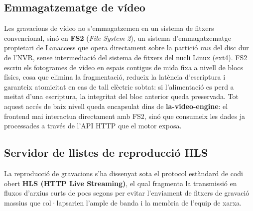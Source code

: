 \subsection{Emmagatzematge de vídeo}
\label{sec:emmagatzematge_video}
Les gravacions de vídeo no s'emmagatzemen en un sistema de fitxers convencional, sinó en \textbf{FS2} (\textit{File System 2}), un sistema d'emmagatzematge propietari de Lanaccess que opera directament sobre la partició \textit{raw} del disc dur de l'NVR, sense intermediació del sistema de fitxers del nucli Linux (ext4). FS2 escriu els fotogrames de vídeo en espais contigus de mida fixa a nivell de blocs físics, cosa que elimina la fragmentació, redueix la latència d'escriptura i garanteix atomicitat en cas de tall elèctric sobtat: si l'alimentació es perd a meitat d'una escriptura, la integritat del bloc anterior queda preservada. Tot aquest accés de baix nivell queda encapsulat dins de \textbf{la-video-engine}: el frontend mai interactua directament amb FS2, sinó que consumeix les dades ja processades a través de l'API HTTP que el motor exposa.

\subsection{Servidor de llistes de reproducció HLS}
La reproducció de gravacions s'ha dissenyat sota el protocol estàndard de codi obert \textbf{HLS (HTTP Live Streaming)}, el qual fragmenta la transmissió en fluxos d'arxius curts de pocs segons per evitar l'enviament de fitxers de gravació massius que col·lapsarien l'ample de banda i la memòria de l'equip de xarxa.

